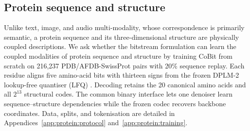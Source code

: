\begingroup
\raggedbottom

\subsection{Protein sequence and structure}
\label{sec:exp:protein}


Unlike text, image, and audio multi-modality, whose correspondence is primarily semantic, a protein sequence and its three-dimensional structure are physically coupled descriptions. We ask whether the bitstream formulation can learn the coupled modalities of protein sequence and structure by training CoBit from scratch on 216,237 PDB/AFDB-SwissProt \citep{protein:pdb, protein:afdb} pairs with 20\% sequence replay. Each residue aligns five amino-acid bits with thirteen signs from the frozen DPLM-2 lookup-free quantiser (LFQ) \citep{protein:dplm2}. Decoding retains the 20 canonical amino acids and all $2^{13}$ structural codes. The common binary interface lets one denoiser learn sequence--structure dependencies while the frozen codec recovers backbone coordinates. Data, splits, and tokenisation are detailed in Appendices~\ref{app:protein:protocol} and~\ref{app:protein:training}.


